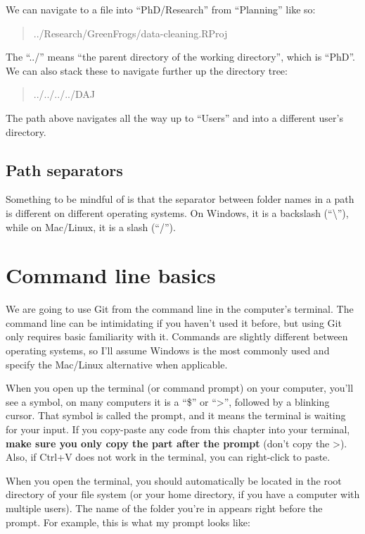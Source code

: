 \documentclass[
]{book}
\begin{document}
We can navigate to a file into ``PhD/Research'' from ``Planning'' like so:

\begin{quote}
../Research/GreenFrogs/data-cleaning.RProj
\end{quote}

The ``../'' means ``the parent directory of the working directory'', which is ``PhD''. We can also stack these to navigate further up the directory tree:

\begin{quote}
../../../../DAJ
\end{quote}

The path above navigates all the way up to ``Users'' and into a different user's directory.

\hypertarget{path-separators}{%
\subsection{Path separators}\label{path-separators}}

Something to be mindful of is that the separator between folder names in a path is different on different operating systems. On Windows, it is a backslash (``\textbackslash{}''), while on Mac/Linux, it is a slash (``/'').

\hypertarget{command-line-basics}{%
\section{Command line basics}\label{command-line-basics}}

We are going to use Git from the command line in the computer's terminal. The command line can be intimidating if you haven't used it before, but using Git only requires basic familiarity with it. Commands are slightly different between operating systems, so I'll assume Windows is the most commonly used and specify the Mac/Linux alternative when applicable.

When you open up the terminal (or command prompt) on your computer, you'll see a symbol, on many computers it is a ``\$'' or ``\textgreater{}'', followed by a blinking cursor. That symbol is called the prompt, and it means the terminal is waiting for your input. If you copy-paste any code from this chapter into your terminal,
\textbf{make sure you only copy the part after the prompt} (don't copy the \textgreater).
Also, if Ctrl+V does not work in the terminal, you can right-click to paste.

When you open the terminal, you should automatically be located in the root directory of your file system (or your home directory, if you have a computer with multiple users). The name of the folder you're in appears right before the prompt. For example, this is what my prompt looks like:
\end{document}
